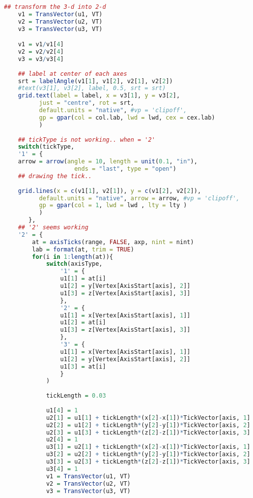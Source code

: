 \documentclass{report}
\begin{document}
\begin{lstlisting}[language = R]
    ## transform the 3-d into 2-d
    v1 = TransVector(u1, VT)
    v2 = TransVector(u2, VT)
    v3 = TransVector(u3, VT)

    v1 = v1/v1[4]
    v2 = v2/v2[4]
    v3 = v3/v3[4]
      
    ## label at center of each axes
    srt = labelAngle(v1[1], v1[2], v2[1], v2[2])
    #text(v3[1], v3[2], label, 0.5, srt = srt)
    grid.text(label = label, x = v3[1], y = v3[2],
          just = "centre", rot = srt,
          default.units = "native", #vp = 'clipoff',
          gp = gpar(col = col.lab, lwd = lwd, cex = cex.lab)
          )
    
    ## tickType is not working.. when = '2'
    switch(tickType,
    '1' = {
    arrow = arrow(angle = 10, length = unit(0.1, "in"),
                    ends = "last", type = "open")  
	## drawing the tick..
    
    grid.lines(x = c(v1[1], v2[1]), y = c(v1[2], v2[2]),
          default.units = "native", arrow = arrow, #vp = 'clipoff',
          gp = gpar(col = 1, lwd = lwd , lty = lty )
          )
       },
    ## '2' seems working
    '2' = {
        at = axisTicks(range, FALSE, axp, nint = nint)
        lab = format(at, trim = TRUE)
        for(i in 1:length(at)){
            switch(axisType, 
                '1' = {
                u1[1] = at[i]
                u1[2] = y[Vertex[AxisStart[axis], 2]]
                u1[3] = z[Vertex[AxisStart[axis], 3]]
                },
                '2' = {
                u1[1] = x[Vertex[AxisStart[axis], 1]]
                u1[2] = at[i]
                u1[3] = z[Vertex[AxisStart[axis], 3]]
                },
                '3' = {
                u1[1] = x[Vertex[AxisStart[axis], 1]]
                u1[2] = y[Vertex[AxisStart[axis], 2]]
                u1[3] = at[i]
                }
            )
            
            tickLength = 0.03
            
            u1[4] = 1
            u2[1] = u1[1] + tickLength*(x[2]-x[1])*TickVector[axis, 1]
            u2[2] = u1[2] + tickLength*(y[2]-y[1])*TickVector[axis, 2]
            u2[3] = u1[3] + tickLength*(z[2]-z[1])*TickVector[axis, 3]
            u2[4] = 1
            u3[1] = u2[1] + tickLength*(x[2]-x[1])*TickVector[axis, 1]
            u3[2] = u2[2] + tickLength*(y[2]-y[1])*TickVector[axis, 2]
            u3[3] = u2[3] + tickLength*(z[2]-z[1])*TickVector[axis, 3]
            u3[4] = 1
            v1 = TransVector(u1, VT)
            v2 = TransVector(u2, VT)
            v3 = TransVector(u3, VT)
                        

\end{lstlisting}
\end{document}
